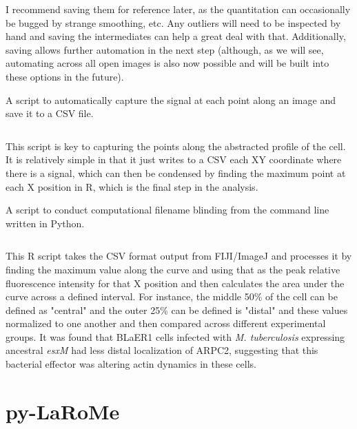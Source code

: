 I recommend saving them for reference later, as the quantitation can occasionally be bugged by strange smoothing, etc. Any outliers will need to be inspected by hand and saving the intermediates can help a great deal with that. Additionally, saving allows further automation in the next step (although, as we will see, automating across all open images is also now possible and will be built into these options in the future).

\begin{code}
\caption{A script to automatically capture the signal at each point along an image and save it to a CSV file.}
\label{surfaceplot}

\inputminted[breaklines,frame=single,fontsize=\small]{python}{source/autoSurfacePlotMeasure.py}

\end{code}

This script is key to capturing the points along the abstracted profile of the cell. It is relatively simple in that it just writes to a CSV each XY coordinate where there is a signal, which can then be condensed by finding the maximum point at each X position in R, which is the final step in the analysis.

\begin{code}
\caption{A script to conduct computational filename blinding from the command line written in Python.}
\label{blinder}

\inputminted[breaklines,frame=single,fontsize=\small]{r}{source/surface_plot_analysis.R}

\end{code}

This R script takes the CSV format output from FIJI/ImageJ and processes it by finding the maximum value along the curve and using that as the peak relative fluorescence intensity for that X position and then calculates the area under the curve across a defined interval. For instance, the middle 50\% of the cell can be defined as "central" and the outer 25\% can be defined is "distal" and these values normalized to one another and then compared across different experimental groups. It was found that BLaER1 cells infected with \textit{M. tuberculosis} expressing ancestral \textit{esxM} had less distal localization of ARPC2, suggesting that this bacterial effector was altering actin dynamics in these cells.

\section{py-LaRoMe}\label{larome}

